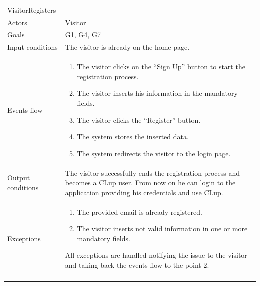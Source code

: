 \footnotesize
\begin{longtable}[]{@{}
  >{\raggedright\arraybackslash}p{}
  >{\raggedright\arraybackslash}p{}@{}}
\toprule
VisitorRegisters & \\ \addlinespace
\midrule
\endhead
Actors & Visitor \\ \addlinespace
Goals & G1, G4, G7 \\ \addlinespace
Input conditions & The visitor is already on the home page. \\ \addlinespace
Events flow & \begin{enumerate}\vspace{-1.35\baselineskip}
    \item The visitor clicks on the ``Sign Up'' button to start the registration process.
    \item The visitor inserts his information in the mandatory fields.
    \item The visitor clicks the ``Register'' button.
    \item The system stores the inserted data.
    \item The system redirects the visitor to the login page.
\vspace{-1.0\baselineskip}\end{enumerate} \\ \addlinespace
Output conditions & The visitor successfully ends the registration process and becomes a CLup user. From now on he can login to the application providing his credentials and use CLup. \\ \addlinespace
Exceptions & \begin{enumerate}\vspace{-1.35\baselineskip}
    \item The provided email is already registered.
    \item The visitor inserts not valid information in one or more mandatory fields.
\end{enumerate}
All exceptions are handled notifying the issue to the visitor and taking back the events flow to the point 2. \\ \addlinespace
\bottomrule
\end{longtable}

